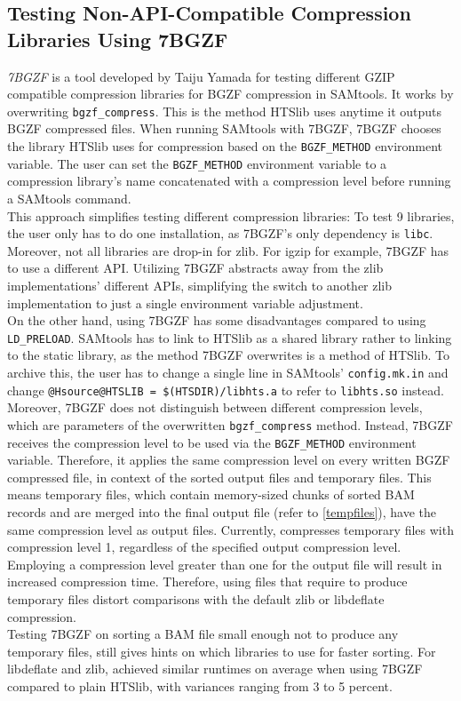 \subsection{Testing Non-API-Compatible Compression Libraries Using 7BGZF}
\textit{7BGZF} \cite{yamada_7bgzf_2020} is a tool developed by Taiju Yamada for testing different GZIP compatible compression libraries for BGZF compression in SAMtools. It works by overwriting \texttt{bgzf\_compress}. This is the method HTSlib uses anytime it outputs BGZF compressed files. When running SAMtools with 7BGZF, 7BGZF chooses the library HTSlib uses for compression based on the \texttt{BGZF\_METHOD} environment variable. The user can set the \texttt{BGZF\_METHOD} environment variable to a compression library's name concatenated with a compression level before running a SAMtools command. \\
This approach simplifies testing different compression libraries:
To test 9 libraries, the user only has to do one installation, as 7BGZF's only dependency is \texttt{libc}. Moreover, not all libraries are drop-in for zlib. For igzip for example, 7BGZF has to use a different API. Utilizing 7BGZF abstracts away from the zlib implementations' different APIs, simplifying the switch to another zlib implementation to just a single environment variable adjustment.
\\
On the other hand, using 7BGZF has some disadvantages compared to using \texttt{LD\_PRELOAD}. SAMtools has to link to HTSlib as a shared library rather to linking to the static library, as the method 7BGZF overwrites is a method of HTSlib. To archive this, the user has to change a single line in SAMtools' \texttt{config.mk.in} and change \texttt{@Hsource@HTSLIB = \$(HTSDIR)/libhts.a} to refer to \texttt{libhts.so} instead. \\
Moreover, 7BGZF does not distinguish between different compression levels, which are parameters of the overwritten \texttt{bgzf\_compress} method. Instead, 7BGZF receives the compression level to be used via the \texttt{BGZF\_METHOD} environment variable. Therefore, it applies the same compression level on every written BGZF compressed file, in context of \sort the sorted output files and temporary files. 
This means temporary files, which contain memory-sized chunks of sorted BAM records and are merged into the final output file (refer to \ref{tempfiles}), have the same compression level as output files. Currently, \sort compresses temporary files with compression level 1, regardless of the specified output compression level. Employing a compression level greater than one for the output file will result in increased compression time. Therefore, using files that require \sort to produce temporary files distort comparisons with the default zlib or libdeflate compression. \\
Testing 7BGZF on sorting a BAM file small enough not to produce any temporary files, still gives hints on which libraries to use for faster sorting. For libdeflate and zlib, \sort achieved similar runtimes on average when using 7BGZF compared to plain HTSlib, with variances ranging from 3 to 5 percent. \\

